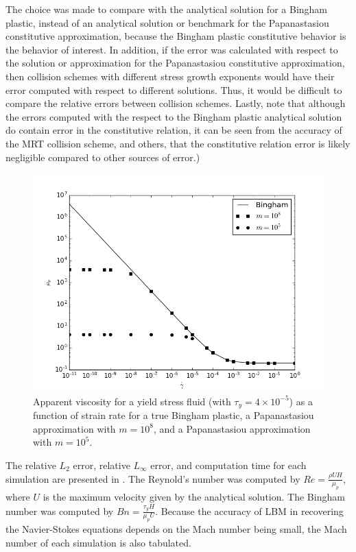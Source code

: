 The choice was made to compare with the analytical solution for a Bingham plastic, instead of an analytical solution or benchmark for the Papanastasiou constitutive approximation, because the Bingham plastic constitutive behavior is the behavior of interest. In addition, if the error was calculated with respect to the solution or approximation for the Papanastasiou constitutive approximation, then collision schemes with different stress growth exponents would have their error computed with respect to different solutions. Thus, it would be difficult to compare the relative errors between collision schemes. Lastly, note that although the errors computed with the respect to the Bingham plastic analytical solution do contain error in the constitutive relation, it can be seen from the accuracy of the MRT collision scheme, and others, that the constitutive relation error is likely negligible compared to other sources of error.)

\begin{figure}
	\centering
	\includegraphics[width=\linewidth]{figs/viscosity_yield-stress}
	\caption{Apparent viscosity for a yield stress fluid (with $\tau_y = 4 \times 10^{-5}$) as a function of strain rate for a true Bingham plastic, a Papanastasiou approximation with $m = 10^8$, and a Papanastasiou approximation with $m = 10^5$.}
	\label{fig:viscosity}
\end{figure}

The relative $L_2$ error, relative $L_{\infty}$ error, and computation time for each simulation are presented in .
The Reynold's number was computed by $Re = \frac{\rho U H}{\mu_p}$, where $U$ is the maximum velocity given by the analytical solution.
The Bingham number was computed by $Bn = \frac{\tau_y H}{\mu_p U}$.
Because the accuracy of LBM in recovering the Navier-Stokes equations depends on the Mach number being small, the Mach number of each simulation is also tabulated.

